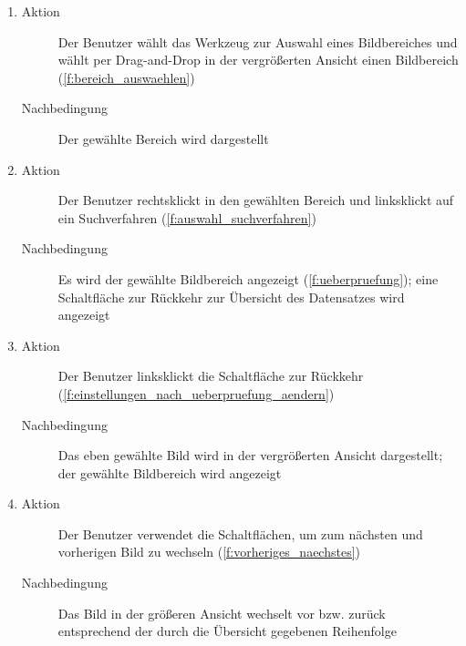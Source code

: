 \begin{enumerate} [label=\bfseries /TS \arabic*0/, leftmargin=*]
\begin{enumerate}
		\begin{description}
			\item[Aktion] Der Benutzer linksklickt die Schaltfläche zur Rückkehr (\ref{f:einstellungen_nach_ueberpruefung_aendern})
			\item[Nachbedingung] Das eben gewählte Bild wird in der vergrößerten Ansicht dargestellt
		\end{description}
		\item
		\begin{description}
			\item[Aktion] Der Benutzer wählt das Werkzeug zur Auswahl eines Bildbereiches und wählt per Drag-and-Drop in der vergrößerten Ansicht einen Bildbereich (\ref{f:bereich_auswaehlen})
			\item[Nachbedingung] Der gewählte Bereich wird dargestellt
		\end{description}
		\item
		\begin{description}
			\item[Aktion] Der Benutzer rechtsklickt in den gewählten Bereich und linksklickt auf ein Suchverfahren (\ref{f:auswahl_suchverfahren})
			\item[Nachbedingung] Es wird der gewählte Bildbereich angezeigt (\ref{f:ueberpruefung}); eine Schaltfläche zur Rückkehr zur Übersicht des Datensatzes wird angezeigt
		\end{description}
		\item
		\begin{description}
			\item[Aktion] Der Benutzer linksklickt die Schaltfläche zur Rückkehr (\ref{f:einstellungen_nach_ueberpruefung_aendern})
			\item[Nachbedingung] Das eben gewählte Bild wird in der vergrößerten Ansicht dargestellt; der gewählte Bildbereich wird angezeigt
		\end{description}
		\item
		\begin{description}
			\item[Aktion] Der Benutzer verwendet die Schaltflächen, um zum nächsten und vorherigen Bild zu wechseln (\ref{f:vorheriges_naechstes})
			\item[Nachbedingung] Das Bild in der größeren Ansicht wechselt vor bzw. zurück entsprechend der durch die Übersicht gegebenen Reihenfolge
		\end{description}
	\end{enumerate}


\end{enumerate}
